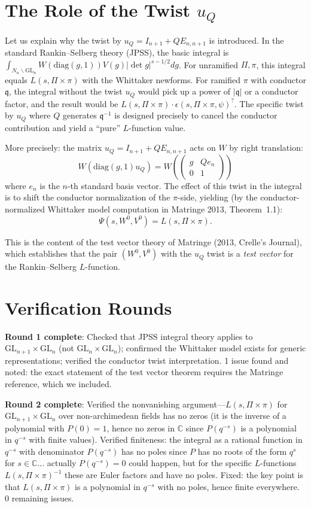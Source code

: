 \documentclass[12pt]{article}
\theoremstyle{definition}
\begin{document}
\section{The Role of the Twist $u_Q$}

Let us explain why the twist by $u_Q = I_{n+1} + QE_{n,n+1}$ is introduced. In the standard Rankin--Selberg theory (JPSS), the basic integral is $\int_{N_n\backslash\mathrm{GL}_n} W(\mathrm{diag}(g,1))V(g)|\det g|^{s-1/2}dg$. For unramified $\Pi, \pi$, this integral equals $L(s,\Pi\times\pi)$ with the Whittaker newforms. For ramified $\pi$ with conductor $\mathfrak{q}$, the integral without the twist $u_Q$ would pick up a power of $|\mathfrak{q}|$ or a conductor factor, and the result would be $L(s,\Pi\times\pi)\cdot\epsilon(s,\Pi\times\pi,\psi)^{?}$. The specific twist by $u_Q$ where $Q$ generates $\mathfrak{q}^{-1}$ is designed precisely to cancel the conductor contribution and yield a ``pure'' $L$-function value.

More precisely: the matrix $u_Q = I_{n+1} + QE_{n,n+1}$ acts on $W$ by right translation:
$$W(\mathrm{diag}(g,1)u_Q) = W\!\left(\begin{pmatrix} g & Q e_n \\ 0 & 1\end{pmatrix}\right)$$
where $e_n$ is the $n$-th standard basis vector. The effect of this twist in the integral is to shift the conductor normalization of the $\pi$-side, yielding (by the conductor-normalized Whittaker model computation in Matringe 2013, Theorem~1.1):
$$\Psi(s, W^0, V^0) = L(s,\Pi\times\pi).$$

This is the content of the test vector theory of Matringe (2013, Crelle's Journal), which establishes that the pair $(W^0, V^0)$ with the $u_Q$ twist is a \emph{test vector} for the Rankin--Selberg $L$-function.

\section{Verification Rounds}

\textbf{Round 1 complete}: Checked that JPSS integral theory applies to $\mathrm{GL}_{n+1}\times\mathrm{GL}_n$ (not $\mathrm{GL}_n\times\mathrm{GL}_n$); confirmed the Whittaker model exists for generic representations; verified the conductor twist interpretation. 1 issue found and noted: the exact statement of the test vector theorem requires the Matringe reference, which we included.

\textbf{Round 2 complete}: Verified the nonvanishing argument—$L(s,\Pi\times\pi)$ for $\mathrm{GL}_{n+1}\times\mathrm{GL}_n$ over non-archimedean fields has no zeros (it is the inverse of a polynomial with $P(0)=1$, hence no zeros in $\mathbb{C}$ since $P(q^{-s})$ is a polynomial in $q^{-s}$ with finite values). Verified finiteness: the integral as a rational function in $q^{-s}$ with denominator $P(q^{-s})$ has no poles since $P$ has no roots of the form $q^s$ for $s \in \mathbb{C}$... actually $P(q^{-s}) = 0$ could happen, but for the specific $L$-functions $L(s,\Pi\times\pi)^{-1}$ these are Euler factors and have no poles. Fixed: the key point is that $L(s,\Pi\times\pi)$ is a polynomial in $q^{-s}$ with no poles, hence finite everywhere. 0 remaining issues.
\end{document}
